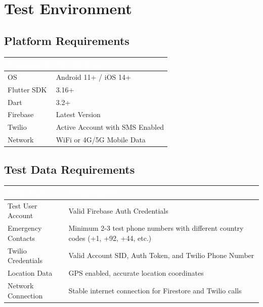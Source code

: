 \documentclass[12pt,a4paper]{article}
\begin{document}
\newpage

\section{Test Environment}

\subsection{Platform Requirements}
\begin{table}[h]
\centering
\begin{tabularx}{\textwidth}{|l|X|}
\hline
\rowcolor{headercolor}
\textcolor{white}{\textbf{Component}} & \textcolor{white}{\textbf{Specification}} \\
\hline
OS & Android 11+ / iOS 14+ \\
\hline
Flutter SDK & 3.16+ \\
\hline
Dart & 3.2+ \\
\hline
Firebase & Latest Version \\
\hline
Twilio & Active Account with SMS Enabled \\
\hline
Network & WiFi or 4G/5G Mobile Data \\
\hline
\end{tabularx}
\end{table}

\subsection{Test Data Requirements}
\begin{table}[h]
\centering
\setlength{\extrarowheight}{8pt}
\begin{tabularx}{\textwidth}{|l|X|}
\hline
\rowcolor{headercolor}
\textcolor{white}{\textbf{Data Type}} & \textcolor{white}{\textbf{Requirements}} \\
\hline
Test User Account & Valid Firebase Auth Credentials \\
\hline
Emergency Contacts & Minimum 2-3 test phone numbers with different country codes (+1, +92, +44, etc.) \\
\hline
Twilio Credentials & Valid Account SID, Auth Token, and Twilio Phone Number \\
\hline
Location Data & GPS enabled, accurate location coordinates \\
\hline
Network Connection & Stable internet connection for Firestore and Twilio calls \\
\hline
\end{tabularx}
\end{table}
\end{document}
